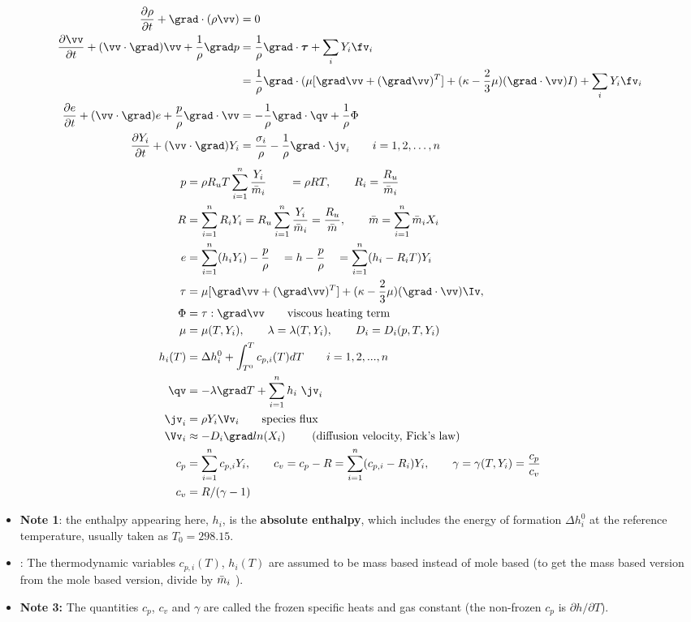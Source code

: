 \documentclass{article}
\begin{document}
\begin{align}
   {\partial \rho  \over \partial t} + \grad\cdot(\rho \vv)&=0 \label{eq:continuity}\\
   {\partial \vv  \over \partial t}  + (\vv\cdot\grad)\vv +{1\over\rho} \grad p 
       &= {1\over\rho}\grad\cdot\tauv +\sum_i Y_i \fv_i\\
       & = {1\over\rho} \grad\cdot( \mu [\grad \vv +(\grad\vv)^T] +(\kappa-{2\over3}\mu) (\grad\cdot\vv)I)
          +\sum_i Y_i \fv_i\\
   {\partial e  \over \partial t}  + (\vv\cdot\grad)e + {p\over\rho}\grad\cdot\vv
           &= -{1\over\rho} \grad\cdot\qv  + {1\over\rho}\Phi    \\
  {\partial Y_i \over \partial t} + (\vv\cdot\grad) Y_i &= {\sigma_i \over \rho}
               -{1\over\rho}\grad\cdot\jv_i \qquad i=1,2,\ldots,n
\end{align}
\begin{align}
  p &= \rho R_u T \sumi {Y_i\over\mbar_i} \qquad = \rho R T ,\qquad R_i = {R_u\over \mbar_i}\\
  R & = \sumi R_i Y_i = R_u \sumi {Y_i\over\mbar_i} = {R_u \over \mbar}, \qquad \mbar=\sumi \mbar_i X_i   \\
  e &= \sumi( h_i Y_i) - {p\over\rho} \quad = h - {p\over\rho} \quad = \sumi( h_i - R_i T )Y_i \\
  \tau &= \mu[ \grad\vv + (\grad\vv)^T ] + (\kappa-{2\over3}\mu)(\grad\cdot\vv)\Iv , \\
     \Phi&=\tau : \grad\vv \qquad \mbox{viscous heating term} \\
  \mu &=\mu(T,Y_i), \qquad \lambda=\lambda(T,Y_i), \qquad D_i = D_i(p,T,Y_i) \\
  h_i(T) &= \Delta h_i^0 + \int_{T^0}^T c_{p,i}(T) dT \qquad i=1,2,...,n \\
  \qv &= - \lambda \grad T + \sumi h_i ~\jv_i  \quad  \\
  \jv_i & = \rho Y_i \Vv_i \qquad\mbox{species flux} \\
 \Vv_i &\approx -D_i \grad ln(X_i) \qquad\mbox{ (diffusion velocity, Fick's law)} \\
  c_p &= \sumi c_{p,i} Y_i , \qquad   c_v = c_p - R = \sumi (c_{p,i}-R_i) Y_i,\qquad   
        \gamma = \gamma(T,Y_i) = {c_p \over c_v} \\
  c_v &= R/(\gamma-1)
\end{align}
\begin{itemize}
\item {\bf Note 1}: the enthalpy appearing here, $h_i$, is the {\bf absolute enthalpy}, which includes 
  the energy of formation $ \Delta h_i^0$
  at the reference temperature, usually taken as $T_0=298.15$.
\item {}: The thermodynamic variables $c_{p,i}(T)$, $h_i(T)$ are assumed to be mass based instead
  of mole based (to get the mass based version from the mole based version, divide by $\bar{m}_i$ ).
\item {\bf Note 3:} The quantities $c_p$, $c_v$ and $\gamma$ are called the frozen specific heats and
     gas constant (the non-frozen $c_p$ is $\partial h /\partial T$).
\end{itemize}
\end{document}
